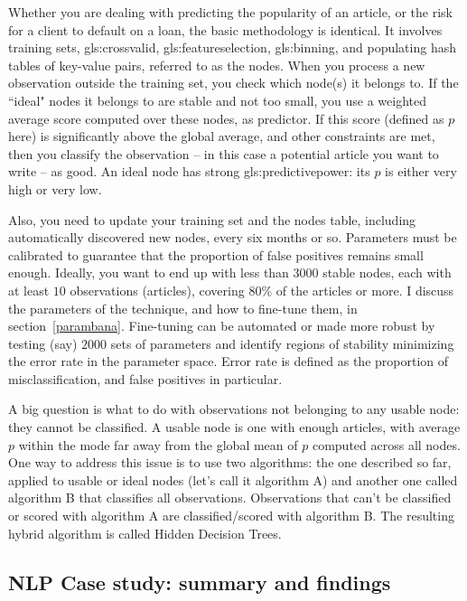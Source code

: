 \documentclass[oneside,10pt]{book}
\begin{document}
Whether you are dealing with predicting the popularity of an article, or the risk for a client to default on a loan, the basic methodology is identical. It involves training sets, \gls{gls:crossvalid}, \gls{gls:featureselection}, \gls{gls:binning}, and populating hash tables of key-value pairs, referred to as the nodes.
When you process a new observation outside the training set, you check which node(s) it belongs to. If the ``ideal" nodes it belongs to are stable and not too small, you use a weighted average score computed over these nodes, as predictor.  If this score (defined as $p$ here) is significantly above the global average, and other constraints are met, then you classify the observation -- in this case a potential article  you want to write -- as good. An ideal node has strong \gls{gls:predictivepower}: its $p$ is either
  very high or very low.

Also, you need to update your training set and the nodes table, including automatically discovered new nodes, every six months or so.
Parameters must be calibrated to guarantee that the proportion of false positives  remains small enough. Ideally, you want to end up with
 less than $\num{3000}$ stable nodes, each with at least $10$ observations (articles), covering $80\%$ of the articles or more. 
I discuss the parameters of the technique, and how to fine-tune them, in section~\ref{parambana}. Fine-tuning can be automated or made more robust by testing (say) 
$\num{2000}$ sets of parameters and identify regions of stability minimizing the error rate in the parameter space.  Error rate is defined as the proportion of misclassification, and false positives in particular.  

A big question is what to do with observations not belonging to any usable node: they cannot be classified. A \textcolor{index}{usable node} is one with enough articles, with average $p$ within the mode far away from the global mean of $p$ computed across all nodes.
One way to address this issue is to use two algorithms: the one described so far, applied to usable or ideal nodes (let's call it algorithm A) and another one called algorithm B that classifies all observations. Observations that can't be classified or scored with algorithm A are classified/scored with algorithm B. 
The resulting hybrid algorithm is called Hidden Decision Trees. 


\subsection{NLP Case study: summary and findings}
\end{document}
